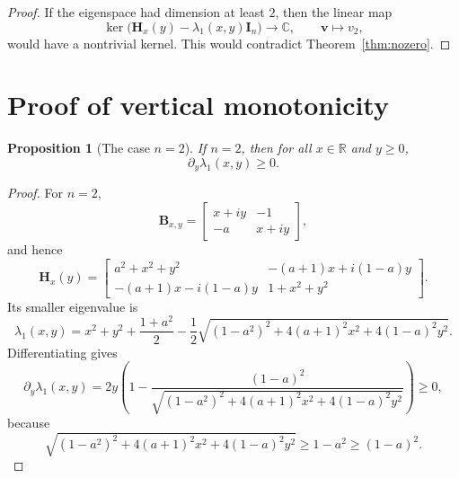 \documentclass[11pt]{article}
\numberwithin{equation}{section}
\newtheorem{proposition}[theorem]{Proposition}
\begin{document}
\begin{proof}
If the eigenspace had dimension at least $2$, then the linear map
\[
\ker\bigl(\mathbf H_x(y)-\lambda_1(x,y)\mathbf I_n\bigr)\longrightarrow\mathbb{C},
\qquad
\bm v\longmapsto v_2,
\]
would have a nontrivial kernel.  This would contradict Theorem~\ref{thm:nozero}.
\end{proof}

\section{Proof of vertical monotonicity}\label{sec:proof}

\begin{proposition}[The case $n=2$]\label{prop:n2}
If $n=2$, then for all $x\in\mathbb{R}$ and $y\ge0$,
\[
\partial_y\lambda_1(x,y)\ge0.
\]
\end{proposition}

\begin{proof}
For $n=2$,
\[
\mathbf B_{x,y}
=
\begin{bmatrix}
x+iy & -1\\
-a & x+iy
\end{bmatrix},
\]
and hence
\[
\mathbf H_x(y)
=
\begin{bmatrix}
a^2+x^2+y^2 & -(a+1)x+i(1-a)y\\
-(a+1)x-i(1-a)y & 1+x^2+y^2
\end{bmatrix}.
\]
Its smaller eigenvalue is
\[
\lambda_1(x,y)
=
x^2+y^2+\frac{1+a^2}{2}
-\frac12\sqrt{(1-a^2)^2+4(a+1)^2x^2+4(1-a)^2y^2}.
\]
Differentiating gives
\[
\partial_y\lambda_1(x,y)
=
2y\left(
1-\frac{(1-a)^2}
{\sqrt{(1-a^2)^2+4(a+1)^2x^2+4(1-a)^2y^2}}
\right)\ge0,
\]
because
\[
\sqrt{(1-a^2)^2+4(a+1)^2x^2+4(1-a)^2y^2}\ge 1-a^2\ge (1-a)^2.
\]
\end{proof}
\end{document}
